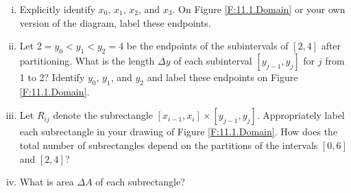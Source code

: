 \begin{pa}
\begin{enumerate}[i.]
    \item Explicitly identify $x_0$, $x_1$, $x_2$, and $x_3$. On Figure \ref{F:11.1.Domain} or your own version of the diagram, label these endpoints.
    	
		
	       \item Let $2=y_0 < y_1 < y_2=4$ be the endpoints of the subintervals of $[2,4]$ after partitioning. What is the length $\Delta y$ of each subinterval $[y_{j-1},y_j]$ for $j$ from 1 to 2? Identify $y_0$, $y_1$, and $y_2$ and label these endpoints on Figure \ref{F:11.1.Domain}.
	

	       \item Let $R_{ij}$ denote the subrectangle $[x_{i-1},x_i] \times [y_{j-1},y_j]$.  Appropriately label each subrectangle in your drawing of Figure \ref{F:11.1.Domain}.  How does the total number of subrectangles depend on the partitions of the intervals $[0,6]$ and $[2,4]$?
	
	
	       \item What is area $\Delta A$ of each subrectangle?

            \end{enumerate}
	\ea
\end{pa}


